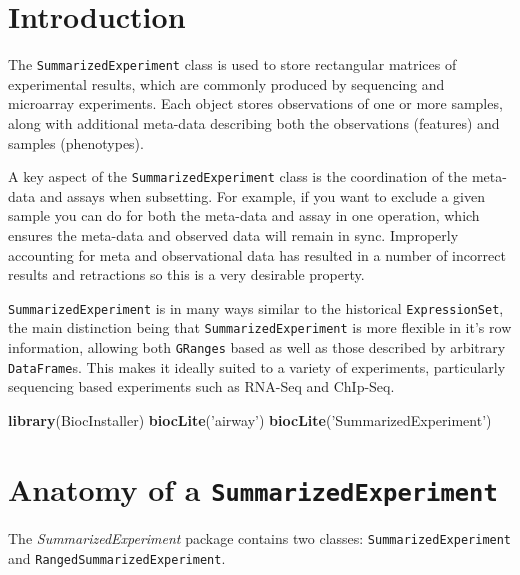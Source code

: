 \documentclass[]{article}
\title{}
\author{}
\date{}
\newenvironment{Shaded}{\begin{snugshade}}{\end{snugshade}}
\newcommand{\KeywordTok}[1]{\textcolor[rgb]{0.13,0.29,0.53}{\textbf{#1}}}
\newcommand{\NormalTok}[1]{#1}
\newcommand{\StringTok}[1]{\textcolor[rgb]{0.31,0.60,0.02}{#1}}
\begin{document}
\hypertarget{introduction}{%
\section{Introduction}\label{introduction}}

The \texttt{SummarizedExperiment} class is used to store rectangular
matrices of experimental results, which are commonly produced by
sequencing and microarray experiments. Each object stores observations
of one or more samples, along with additional meta-data describing both
the observations (features) and samples (phenotypes).

A key aspect of the \texttt{SummarizedExperiment} class is the
coordination of the meta-data and assays when subsetting. For example,
if you want to exclude a given sample you can do for both the meta-data
and assay in one operation, which ensures the meta-data and observed
data will remain in sync. Improperly accounting for meta and
observational data has resulted in a number of incorrect results and
retractions so this is a very desirable property.

\texttt{SummarizedExperiment} is in many ways similar to the historical
\texttt{ExpressionSet}, the main distinction being that
\texttt{SummarizedExperiment} is more flexible in it's row information,
allowing both \texttt{GRanges} based as well as those described by
arbitrary \texttt{DataFrame}s. This makes it ideally suited to a variety
of experiments, particularly sequencing based experiments such as
RNA-Seq and ChIp-Seq.

\begin{Shaded}
\begin{Highlighting}[]
\KeywordTok{library}\NormalTok{(BiocInstaller)}
\KeywordTok{biocLite}\NormalTok{(}\StringTok{'airway'}\NormalTok{)}
\KeywordTok{biocLite}\NormalTok{(}\StringTok{'SummarizedExperiment'}\NormalTok{)}
\end{Highlighting}
\end{Shaded}

\hypertarget{anatomy-of-a-summarizedexperiment}{%
\section{\texorpdfstring{Anatomy of a
\texttt{SummarizedExperiment}}{Anatomy of a SummarizedExperiment}}\label{anatomy-of-a-summarizedexperiment}}

The \emph{SummarizedExperiment} package contains two classes:
\texttt{SummarizedExperiment} and \texttt{RangedSummarizedExperiment}.
\end{document}
